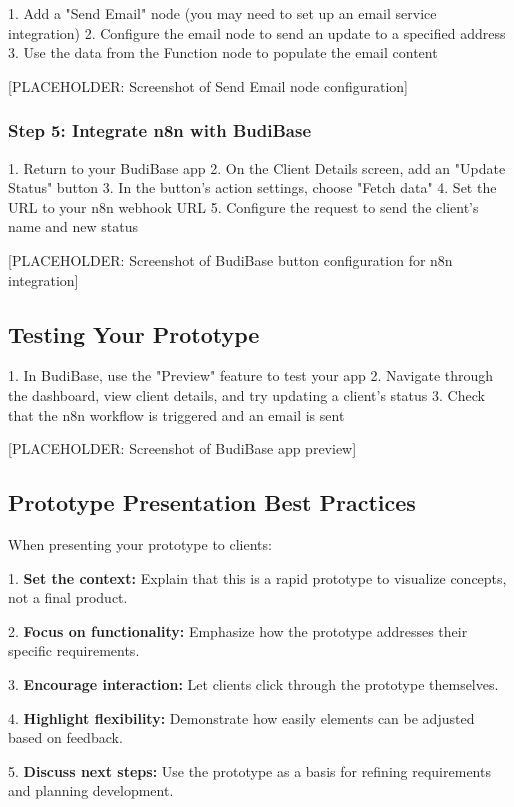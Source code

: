 1. Add a "Send Email" node (you may need to set up an email service integration)
2. Configure the email node to send an update to a specified address
3. Use the data from the Function node to populate the email content

[PLACEHOLDER: Screenshot of Send Email node configuration]

\subsubsection{Step 5: Integrate n8n with BudiBase}

1. Return to your BudiBase app
2. On the Client Details screen, add an "Update Status" button
3. In the button's action settings, choose "Fetch data"
4. Set the URL to your n8n webhook URL
5. Configure the request to send the client's name and new status

[PLACEHOLDER: Screenshot of BudiBase button configuration for n8n integration]

\subsection{Testing Your Prototype}

1. In BudiBase, use the "Preview" feature to test your app
2. Navigate through the dashboard, view client details, and try updating a client's status
3. Check that the n8n workflow is triggered and an email is sent

[PLACEHOLDER: Screenshot of BudiBase app preview]

\subsection{Prototype Presentation Best Practices}

When presenting your prototype to clients:

1. \textbf{Set the context:} Explain that this is a rapid prototype to visualize concepts, not a final product.

2. \textbf{Focus on functionality:} Emphasize how the prototype addresses their specific requirements.

3. \textbf{Encourage interaction:} Let clients click through the prototype themselves.

4. \textbf{Highlight flexibility:} Demonstrate how easily elements can be adjusted based on feedback.

5. \textbf{Discuss next steps:} Use the prototype as a basis for refining requirements and planning development.


